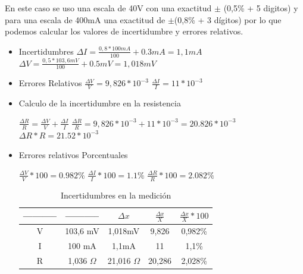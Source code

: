 \documentclass[12pt, letterpaper]{article}
\begin{document}
En este caso se uso una escala de  40V con una exactitud $\pm$ (0,5\% + 5 digitos) y para una escala de 400mA una exactitud de $\pm$(0,8\% + 3 dígitos)
por lo que podemos calcular los valores de incertidumbre y errores relativos.
\singlespacing  
\begin{itemize}
\item  Incertidumbres
\singlespacing
$\Delta I= \frac{0,8 * 100mA}{100}+0.3mA=1,1mA$\singlespacing
$\Delta V= \frac{0,5 * 103,6mV}{100}+0.5mV=1,018mV$\singlespacing
\item Errores Relativos\singlespacing
$\frac{\Delta V}{V} = 9,826*10^{-3}$\singlespacing
$\frac{\Delta I}{I} = 11*10^{-3}$ \singlespacing
\item Calculo de la incertidumbre en la resistencia\singlespacing

$\frac{\Delta R}{R} = \frac{\Delta V}{V} + \frac{\Delta I}{I}$ \singlespacing
$\frac{\Delta R}{R} = 9,826*10^{-3}+11*10^{-3}=20.826*10^{-3}$ \singlespacing
$\Delta R * R = 21.52*10^{-3}$\singlespacing

\item Errores relativos Porcentuales\singlespacing

$\frac{\Delta V}{V} * 100 = 0.982\%$\singlespacing
$\frac{\Delta I}{I} * 100 = 1.1\%$\singlespacing
$\frac{\Delta R}{R} * 100 = 2.082\%$\singlespacing
 
\begin{table}[H]
\centering

	\begin{tabular}{|c|c|c|c|c|}
    	\hline
    	----------- & ----------- & $\Delta x$  & $\frac{\Delta x}{X}$  & $\frac{\Delta x}{X} *100$ \\ \hline
    	V           & 103,6 mV    & 1,018mV & 9,826      & 0,982\%        \\ \hline
    	I           & 100 mA      & 1,1mA   & 11         & 1,1\%          \\ \hline
    	R           & 1,036    $\Omega$    & 21,016 $\Omega$  & 20,286     & 2,028\%        \\ \hline
	\end{tabular}
 \label{tab\insertidumbres}
 \caption{Incertidumbres en la medición}
\end{table}
\end{itemize}
\singlespacing
\end{document}
